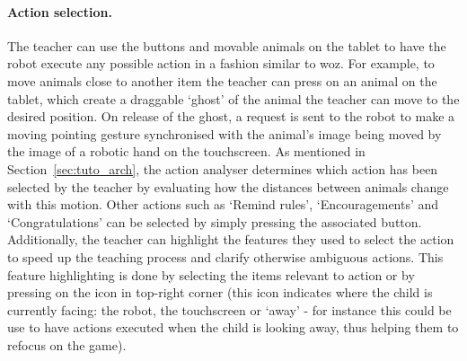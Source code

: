 \paragraph{Action selection.} 
The teacher can use the buttons and movable animals on the tablet to have the robot execute any possible action in a fashion similar to \gls{woz}. For example, to move animals close to another item the teacher can press on an animal on the tablet, which create a draggable `ghost' of the animal the teacher can move to the desired position. On release of the ghost, a request is sent to the robot to make a moving pointing gesture synchronised with the animal's image being moved by the image of a robotic hand on the touchscreen.
As mentioned in Section~\ref{sec:tuto_arch}, the action analyser determines which action has been selected by the teacher by evaluating how the distances between animals change with this motion. Other actions such as `Remind rules', `Encouragements' and  `Congratulations' can be selected by simply pressing the associated button.
Additionally, the teacher can highlight the features they used to select the action to speed up the teaching process and clarify otherwise ambiguous actions. This feature highlighting is done by selecting the items relevant to action or by pressing on the icon in top-right corner (this icon indicates where the child is currently facing: the robot, the touchscreen or `away' - for instance this could be use to have actions executed when the child is looking away, thus helping them to refocus on the game).
